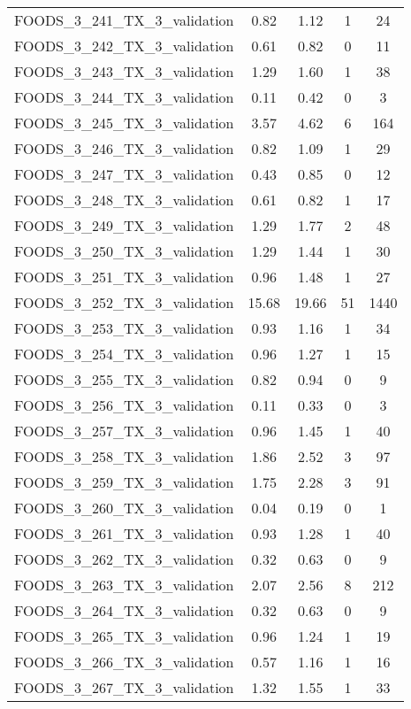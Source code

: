 \begin{table}
\begin{tabular}{|l|c|c|c|c|}
FOODS\_3\_241\_TX\_3\_validation & 0.82 & 1.12 & 1 & 24 \\
FOODS\_3\_242\_TX\_3\_validation & 0.61 & 0.82 & 0 & 11 \\
FOODS\_3\_243\_TX\_3\_validation & 1.29 & 1.60 & 1 & 38 \\
FOODS\_3\_244\_TX\_3\_validation & 0.11 & 0.42 & 0 & 3 \\
FOODS\_3\_245\_TX\_3\_validation & 3.57 & 4.62 & 6 & 164 \\
FOODS\_3\_246\_TX\_3\_validation & 0.82 & 1.09 & 1 & 29 \\
FOODS\_3\_247\_TX\_3\_validation & 0.43 & 0.85 & 0 & 12 \\
FOODS\_3\_248\_TX\_3\_validation & 0.61 & 0.82 & 1 & 17 \\
FOODS\_3\_249\_TX\_3\_validation & 1.29 & 1.77 & 2 & 48 \\
FOODS\_3\_250\_TX\_3\_validation & 1.29 & 1.44 & 1 & 30 \\
FOODS\_3\_251\_TX\_3\_validation & 0.96 & 1.48 & 1 & 27 \\
FOODS\_3\_252\_TX\_3\_validation & 15.68 & 19.66 & 51 & 1440 \\
FOODS\_3\_253\_TX\_3\_validation & 0.93 & 1.16 & 1 & 34 \\
FOODS\_3\_254\_TX\_3\_validation & 0.96 & 1.27 & 1 & 15 \\
FOODS\_3\_255\_TX\_3\_validation & 0.82 & 0.94 & 0 & 9 \\
FOODS\_3\_256\_TX\_3\_validation & 0.11 & 0.33 & 0 & 3 \\
FOODS\_3\_257\_TX\_3\_validation & 0.96 & 1.45 & 1 & 40 \\
FOODS\_3\_258\_TX\_3\_validation & 1.86 & 2.52 & 3 & 97 \\
FOODS\_3\_259\_TX\_3\_validation & 1.75 & 2.28 & 3 & 91 \\
FOODS\_3\_260\_TX\_3\_validation & 0.04 & 0.19 & 0 & 1 \\
FOODS\_3\_261\_TX\_3\_validation & 0.93 & 1.28 & 1 & 40 \\
FOODS\_3\_262\_TX\_3\_validation & 0.32 & 0.63 & 0 & 9 \\
FOODS\_3\_263\_TX\_3\_validation & 2.07 & 2.56 & 8 & 212 \\
FOODS\_3\_264\_TX\_3\_validation & 0.32 & 0.63 & 0 & 9 \\
FOODS\_3\_265\_TX\_3\_validation & 0.96 & 1.24 & 1 & 19 \\
FOODS\_3\_266\_TX\_3\_validation & 0.57 & 1.16 & 1 & 16 \\
FOODS\_3\_267\_TX\_3\_validation & 1.32 & 1.55 & 1 & 33 \\

\end{tabular}
\end{table}
